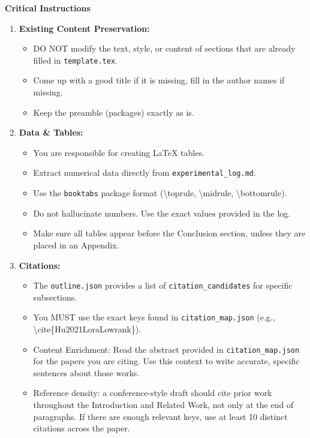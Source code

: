 \vspace{1em}
\noindent\textbf{Critical Instructions}
\begin{enumerate}
    \item \textbf{Existing Content Preservation:} 
    \begin{itemize}
        \item DO NOT modify the text, style, or content of sections that are already filled in \texttt{template.tex}. 
        \item Come up with a good title if it is missing, fill in the author names if missing.
        \item Keep the preamble (packages) exactly as is.
    \end{itemize}
    \item \textbf{Data \& Tables:}
    \begin{itemize}
        \item You are responsible for creating LaTeX tables.
        \item Extract numerical data directly from \texttt{experimental\_log.md}.
        \item Use the \texttt{booktabs} package format (\textbackslash{}toprule, \textbackslash{}midrule, \textbackslash{}bottomrule).
        \item Do not hallucinate numbers. Use the exact values provided in the log.
        \item Make sure all tables appear before the Conclusion section, unless they are placed in an Appendix.
    \end{itemize}
    \item \textbf{Citations:}
    \begin{itemize}
        \item The \texttt{outline.json} provides a list of \texttt{citation\_candidates} for specific subsections.
        \item You MUST use the exact keys found in \texttt{citation\_map.json} (e.g., \textbackslash{}cite\{Hu2021LoraLowrank\}).
        \item Content Enrichment: Read the abstract provided in \texttt{citation\_map.json} for the papers you are citing. Use this context to write accurate, specific sentences about those works.
        \item Reference density: a conference-style draft should cite prior work throughout the Introduction and Related Work, not only at the end of paragraphs. If there are enough relevant keys, use at least 10 distinct citations across the paper.

\end{itemize}
\end{enumerate}
